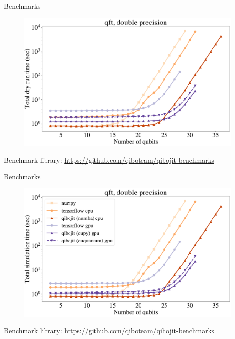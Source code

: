 \documentclass[11p,aspectratio=169]{beamer}
\begin{document}
\begin{frame}{Benchmarks}
    \begin{figure}
        \includegraphics[width=0.8 \textwidth]{figures/qibo_scaling_qft_total_dry_time_double.pdf} 
    \end{figure}
    Benchmark library: \url{https://github.com/qiboteam/qibojit-benchmarks}
\end{frame}


\begin{frame}{Benchmarks}
    \begin{figure}
        \includegraphics[width=0.8 \textwidth]{figures/qibo_scaling_qft_total_simulation_time_double.pdf} 
    \end{figure}
    Benchmark library: \url{https://github.com/qiboteam/qibojit-benchmarks}
\end{frame}
\end{document}
